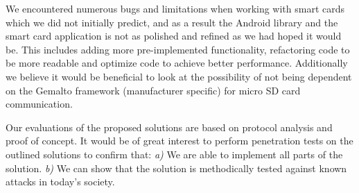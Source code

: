 We encountered numerous bugs and limitations when working with smart cards which we did not initially predict, and as a result the Android library and the smart card application is not as polished and refined as we had hoped it would be. This includes adding more pre-implemented functionality, refactoring code to be more readable and optimize code to achieve better performance. Additionally we believe it would be beneficial to look at the possibility of not being dependent on the Gemalto framework (manufacturer specific) for micro SD card communication.

Our evaluations of the proposed solutions are based on protocol analysis and proof of concept. It would be of great interest to perform penetration tests on the outlined solutions to confirm that: \textit{a)} We are able to implement all parts of the solution. \textit{b)} We can show that the solution is methodically tested against known attacks in today's society.
